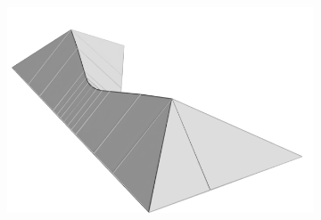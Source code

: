 \begin{figure}
\centering
\setlength{\figwidth}{.18\textwidth}
\setlength{\figwidthTwo}{.17\textwidth}
\setlength{\figwidthTree}{.22\textwidth}
\setlength{\tempheight}{-0.3cm}
\setlength{\tempheightTwo}{-0.5cm}
\begin{subfigure}{\figwidth}\centering
\hspace*{\tempheightTwo}
\includegraphics[width=\figwidthTree]{sources/method/surface/union_of_cones_cropped.png}

\vspace{\tempheight}


\end{subfigure}
\end{figure}
